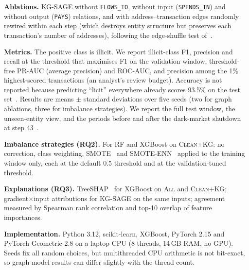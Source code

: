 \textbf{Ablations.} \textsc{KG-SAGE} without \texttt{FLOWS\_TO}, without
input (\texttt{SPENDS\_IN}) and without output (\texttt{PAYS}) relations,
and with address--transaction edges randomly rewired within each step (which
destroys entity structure but preserves each transaction's number of
addresses), following the edge-shuffle test of~\cite{maganti2026}.

\textbf{Metrics.} The positive class is illicit. We report illicit-class F1,
precision and recall at the threshold that maximises F1 on the validation
window, threshold-free PR-AUC (average precision) and ROC-AUC, and precision
among the 1\% highest-scored transactions (an analyst's review budget).
Accuracy is not reported because predicting ``licit'' everywhere already scores
93.5\% on the test set~\cite{he2009}. Results are means $\pm$ standard
deviations over five seeds (two for graph ablations, three for imbalance
strategies). We report the full test window, the unseen-entity view, and the
periods before and after the dark-market shutdown at step
43~\cite{weber2019}.

\textbf{Imbalance strategies (RQ2).} For RF and XGBoost on \textsc{Clean+KG}:
no correction, class weighting, SMOTE~\cite{chawla2002} and
SMOTE-ENN~\cite{batista2004} applied to the training window only, each at the
default 0.5 threshold and at the validation-tuned threshold.

\textbf{Explanations (RQ3).} TreeSHAP~\cite{lundberg2017} for XGBoost on
\textsc{All} and \textsc{Clean+KG}; gradient$\times$input attributions for
\textsc{KG-SAGE} on the same inputs; agreement measured by Spearman rank
correlation and top-10 overlap of feature importances.

\textbf{Implementation.} Python 3.12, scikit-learn, XGBoost, PyTorch 2.15 and
PyTorch Geometric 2.8 on a laptop CPU (8 threads, 14\,GB RAM, no GPU).
Seeds fix all random choices, but multithreaded CPU arithmetic is not
bit-exact, so graph-model results can differ slightly with the thread count.
